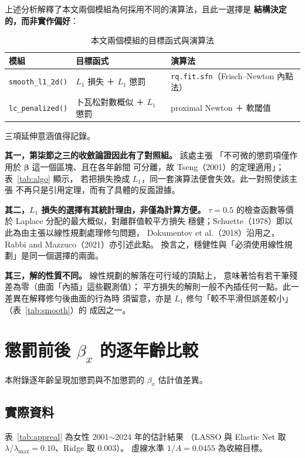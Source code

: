 \documentclass[UTF8, fontset=macnew, a4paper, 12pt]{ctexart}
\begin{document}
上述分析解釋了本文兩個模組為何採用不同的演算法，且此一選擇是
\textbf{結構決定的，而非實作偏好}：

\begin{table}[H]
\centering
\caption{本文兩個模組的目標函式與演算法}
\small
\begin{tabular}{lll}
\toprule
模組 & 目標函式 & 演算法\\
\midrule
\texttt{smooth\_l1\_2d()} & $L_1$ 損失 ＋ $L_1$ 懲罰 &
  \texttt{rq.fit.sfn}（Frisch--Newton 內點法）\\
\texttt{lc\_penalized()} & 卜瓦松對數概似 ＋ $L_1$ 懲罰 &
  proximal Newton ＋ 軟閾值\\
\bottomrule
\end{tabular}
\label{tab:modules}
\end{table}

三項延伸意涵值得記錄。

\textbf{其一，第柒節之三的收斂論證因此有了對照組。} 該處主張
「不可微的懲罰項僅作用於 $\boldsymbol{\beta}$ 這一個區塊、且在各年齡間
可分離，故 Tseng（2001）的定理適用」；表~\ref{tab:algo} 顯示，
若把損失換成 $L_1$，同一套演算法便會失效。此一對照使該主張
不再只是引用定理，而有了具體的反面證據。

\textbf{其二，$L_1$ 損失的選擇有其統計理由，非僅為計算方便。}
$\tau=0.5$ 的檢查函數等價於 Laplace 分配的最大概似，對離群值較平方損失
穩健；Schuette（1978）即以此為由主張以線性規劃處理修勻問題，
Dokumentov et al.（2018）沿用之，Rabbi and Mazzuco（2021）亦引述此點。
換言之，穩健性與「必須使用線性規劃」是同一個選擇的兩面。

\textbf{其三，解的性質不同。} 線性規劃的解落在可行域的頂點上，
意味著恰有若干筆殘差為零（曲面「內插」這些觀測值）；
平方損失的解則一般不內插任何一點。此一差異在解釋修勻後曲面的行為時
須留意，亦是 $L_1$ 修勻「較不平滑但誤差較小」（表~\ref{tab:smooth}）的
成因之一。


\section{懲罰前後 $\beta_x$ 的逐年齡比較}

本附錄逐年齡呈現加懲罰與不加懲罰的 $\beta_x$ 估計值差異。

\subsection{實際資料}

表~\ref{tab:appreal} 為女性 2001$\sim$2024 年的估計結果
（LASSO 與 Elastic Net 取 $\lambda/\lambda_{\max}=0.10$、Ridge 取 0.003）。
虛線水準 $1/A=0.0455$ 為收縮目標。
\end{document}
